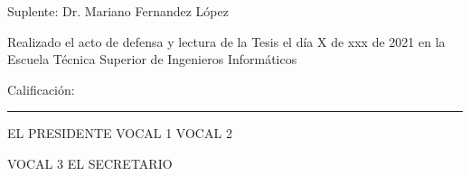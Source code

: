 \documentclass[twoside,11pt]{Latex/Classes/PhDthesisPSnPDF}
\begin{document}
\vspace{5mm}
Suplente: \hspace{1.5mm} Dr. Mariano Fernandez López

\vspace{10mm}
\noindent Realizado el acto de defensa y lectura de la Tesis el d\'{i}a X de xxx de 2021 en la Escuela T\'ecnica Superior de Ingenieros Inform\'aticos

\vspace{5mm}
\noindent Calificaci\'{o}n: \rule{123mm}{0.2mm}
\vspace{20mm}

EL PRESIDENTE \hspace{30mm} VOCAL 1 \hspace{30mm} VOCAL 2

\vspace{30mm}
\hspace{15mm} VOCAL 3 \hspace{45mm} EL SECRETARIO

%




\cleardoublepage


\cleardoublepage



\cleardoublepage


\cleardoublepage
\setcounter{secnumdepth}{3} %
\setcounter{tocdepth}{3}    %

\tableofcontents           %




\listoffigures	%
\end{document}
